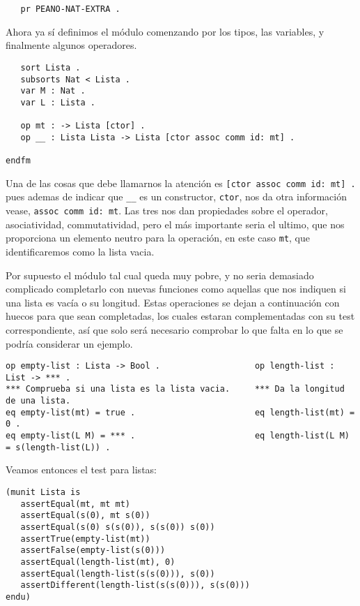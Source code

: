 {\codesize
\begin{verbatim}
   pr PEANO-NAT-EXTRA .
\end{verbatim}
}

Ahora ya sí definimos el módulo comenzando por los tipos, las variables, y finalmente algunos operadores. \par

{\codesize
\begin{verbatim}
   sort Lista .
   subsorts Nat < Lista .
   var M : Nat .
   var L : Lista .	

   op mt : -> Lista [ctor] .
   op __ : Lista Lista -> Lista [ctor assoc comm id: mt] .

endfm
\end{verbatim}
}

Una de las cosas que debe llamarnos la atención es \verb"[ctor assoc comm id: mt] ." pues ademas de indicar que \verb"__" es un constructor, \texttt{ctor}, nos da otra información vease, \texttt{assoc comm id: mt}. Las tres nos dan propiedades sobre el operador, asociatividad, commutatividad, pero el más importante seria el ultimo, que nos proporciona un elemento neutro para la operación, en este caso \texttt{mt}, que identificaremos como la lista vacia. \par

Por supuesto el módulo tal cual queda muy pobre, y no seria demasiado complicado completarlo con nuevas funciones como aquellas que nos indiquen si una lista es vacía o su longitud. Estas operaciones se dejan a continuación con huecos para que sean completadas, los cuales estaran complementadas con su test correspondiente, así que solo será necesario comprobar lo que falta en lo que se podría considerar un ejemplo. \par

{\codesize
\begin{verbatim}
op empty-list : Lista -> Bool .                   op length-list : List -> *** .
*** Comprueba si una lista es la lista vacia.     *** Da la longitud de una lista.
eq empty-list(mt) = true .                        eq length-list(mt) = 0 .
eq empty-list(L M) = *** .                        eq length-list(L M) = s(length-list(L)) .
\end{verbatim}
}

Veamos entonces el test para listas: \par

\begin{verbatim}
(munit Lista is
   assertEqual(mt, mt mt)
   assertEqual(s(0), mt s(0))
   assertEqual(s(0) s(s(0)), s(s(0)) s(0))
   assertTrue(empty-list(mt))
   assertFalse(empty-list(s(0)))
   assertEqual(length-list(mt), 0)
   assertEqual(length-list(s(s(0))), s(0))
   assertDifferent(length-list(s(s(0))), s(s(0)))
endu)
\end{verbatim}

